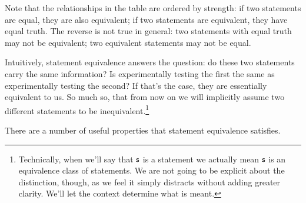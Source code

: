 \documentclass[11pt,letterpaper,fleqn]{memoir} %
\begin{document}
Note that the relationships in the table are ordered by strength: if two statements are equal, they are also equivalent; if two statements are equivalent, they have equal truth. The reverse is not true in general: two statements with equal truth may not be equivalent; two equivalent statements may not be equal.

Intuitively, statement equivalence answers the question: do these two statements carry the same information? Is experimentally testing the first the same as experimentally testing the second? If that's the case, they are essentially equivalent to us. So much so, that from now on we will implicitly assume two different statements to be inequivalent.\footnote{Technically, when we'll say that $\mathsf{s}$ is a statement we actually mean $\mathsf{s}$ is an equivalence class of statements. We are not going to be explicit about the distinction, though, as we feel it simply distracts without adding greater clarity. We'll let the context determine what is meant.}

There are a number of useful properties that statement equivalence satisfies.
\end{document}
